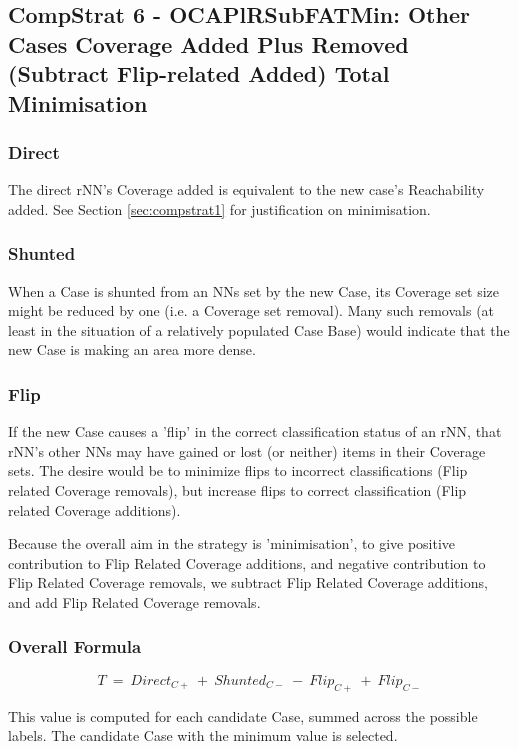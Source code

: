 \documentclass[a4paper,11pt]{report}
\begin{document}
\subsection{CompStrat 6 - OCAPlRSubFATMin: Other Cases Coverage Added Plus Removed (Subtract Flip-related Added) Total Minimisation}

\subsubsection{Direct}

The direct rNN's Coverage added is equivalent to the new case's Reachability added. See Section \ref{sec:compstrat1} for justification on minimisation.

\subsubsection{Shunted}

When a Case is shunted from an NNs set by the new Case, its Coverage set size might be reduced by one (i.e. a Coverage set removal). Many such removals (at least in the situation of a relatively populated Case Base) would indicate that the new Case is making an area more dense.

\subsubsection{Flip}

If the new Case causes a 'flip' in the correct classification status of an rNN, that rNN's other NNs may have gained or lost (or neither) items in their Coverage sets. The desire would be to minimize flips to incorrect classifications (Flip related Coverage removals), but increase flips to correct classification (Flip related Coverage additions).

Because the overall aim in the strategy is 'minimisation', to give positive contribution to Flip Related Coverage additions, and negative contribution to Flip Related Coverage removals, we subtract Flip Related Coverage additions, and add Flip Related Coverage removals.

\subsubsection{Overall Formula}
\[  
  T~=~Direct_{C+}~+~Shunted_{C-}~-~Flip_{C+}~+~Flip_{C-}
\]

This value is computed for each candidate Case, summed across the possible labels. The candidate Case with the minimum value is selected.
\end{document}
